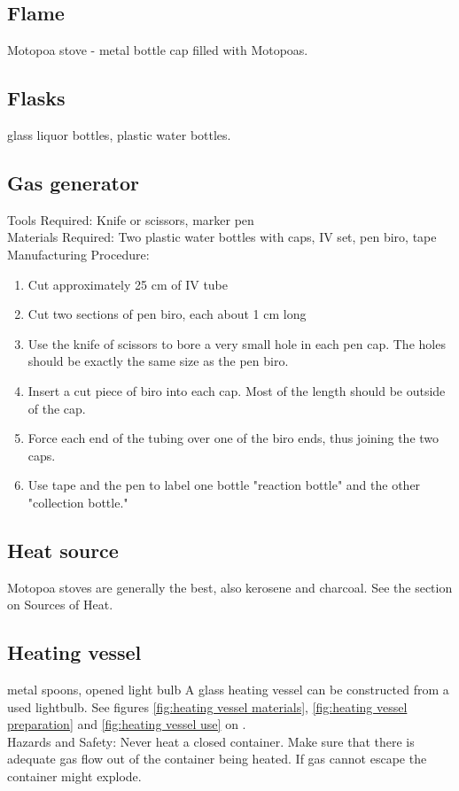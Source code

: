 \subsection*{Flame}
Motopoa stove - metal bottle cap filled with Motopoas.

\subsection*{Flasks}
glass liquor bottles, plastic water bottles.

\subsection*{Gas generator}
Tools Required: Knife or scissors, marker pen\\
Materials Required: Two plastic water bottles with caps, IV set, pen biro, tape\\

Manufacturing Procedure:
\begin{enumerate}
\item{Cut approximately 25 cm of IV tube}
\item{Cut two sections of pen biro, each about 1 cm long}
\item{Use the knife of scissors to bore a very small hole in each pen cap. The holes should be exactly the same size as the pen biro.}
\item{Insert a cut piece of biro into each cap. Most of the length should be outside of the cap.}
\item{Force each end of the tubing over one of the biro ends, thus joining the two caps.}
\item{Use tape and the pen to label one bottle "reaction bottle" and the other "collection bottle."}
\end{enumerate}

\subsection*{Heat source}
Motopoa stoves are generally the best, also kerosene and charcoal. See the section on Sources of Heat.

\subsection*{Heating vessel}
metal spoons, opened light bulb
A glass heating vessel can be constructed from a used lightbulb. See figures \ref{fig:heating vessel materials}, \ref{fig:heating vessel preparation} and \ref{fig:heating vessel use} on \pageref{fig:heating vessel use}.\\
Hazards and Safety: Never heat a closed container. Make sure that there is adequate gas flow out of the container being heated. If gas cannot escape the container might explode.

